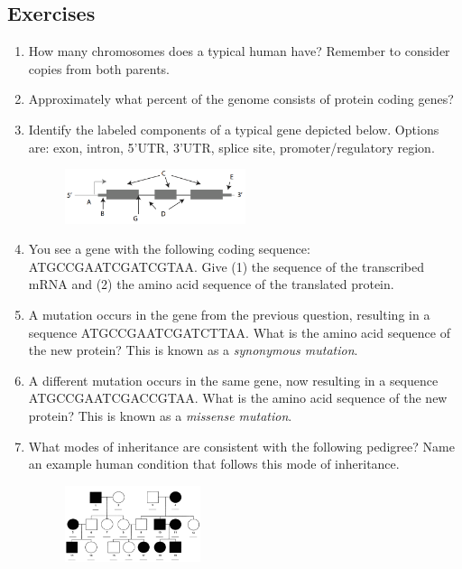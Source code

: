\documentclass[12pt]{article}
\begin{document}
\subsection*{Exercises}
\begin{enumerate}

\item How many chromosomes does a typical human have? Remember to consider copies from both parents.

\item Approximately what percent of the genome consists of protein coding genes?

\item Identify the labeled components of a typical gene depicted below. Options are: exon, intron, 5'UTR, 3'UTR, splice site, promoter/regulatory region.
\begin{figure}[h!]
\centering
\includegraphics[width=200px]{pset1gene.png}
\end{figure}

\item You see a gene with the following coding sequence: ATGCCGAATCGATCGTAA. Give (1) the sequence of the transcribed mRNA and (2) the amino acid sequence of the translated protein.

\item A mutation occurs in the gene from the previous question, resulting in a sequence ATGCCGAATCGATCTTAA. What is the amino acid sequence of the new protein? This is known as a \emph{synonymous mutation}.

\item A different mutation occurs in the same gene, now resulting in a sequence ATGCCGAATCGACCGTAA. What is the amino acid sequence of the new protein? This is known as a \emph{missense mutation}.

\item What modes of inheritance are consistent with the following pedigree? Name an example human condition that follows this mode of inheritance.
\begin{figure}[h!]
\centering
\includegraphics[width=150px]{pset1recessive.png}
\end{figure}


\end{enumerate}
\end{document}
